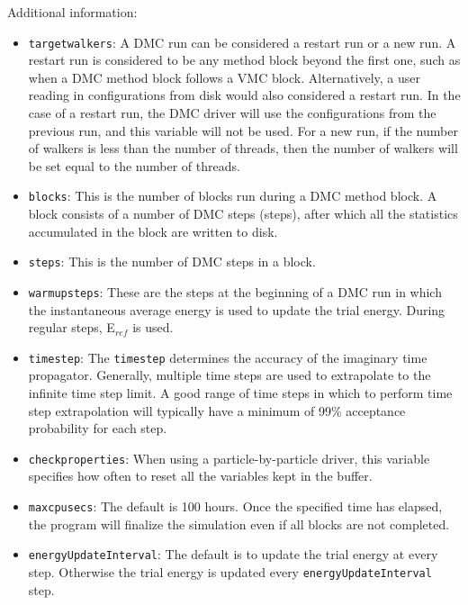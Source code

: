 Additional information:
\begin{itemize}
\item \texttt{targetwalkers}:  A DMC run can be considered a restart run or a new run.  A restart run is considered to be any method block beyond the first one, such as when a DMC method block follows a VMC block.  Alternatively,  a user reading in configurations from disk would also considered a restart run.  In the case of a restart run, the DMC driver will use the configurations from the previous run, and this variable will not be used.  For a new run, if the number of walkers is less than the number of threads, then the number of walkers will be set equal to the number of threads.  

\item \texttt{blocks}: This is the number of blocks run during a DMC method block.  A block consists of a number of DMC steps (steps), after which all the statistics accumulated in the block are written to disk.

\item \texttt{steps}: This is the number of DMC steps in a block.

\item \texttt{warmupsteps}: These are the steps at the beginning of a DMC run in which the 
instantaneous average energy is used to update the trial energy.  During regular steps, E$_{ref}$ is used.

\item \texttt{timestep}: The \texttt{timestep} determines the accuracy of the imaginary time propagator.  Generally, multiple time steps are used to extrapolate to the infinite time step limit.   A good range of time steps  in which to perform time step extrapolation will typically have a minimum of 99\% acceptance probability for each step.

\item \texttt{checkproperties}:  When using a particle-by-particle driver, this variable specifies how often to reset all the variables kept in the buffer.

\item \texttt{maxcpusecs}: The default is 100 hours. Once the specified time has elapsed, the program will finalize the simulation even if all blocks are not  completed.

\item \texttt{energyUpdateInterval}: The default is to update the trial energy at every step. Otherwise the trial energy is updated every \texttt{energyUpdateInterval} step.


\end{itemize}
